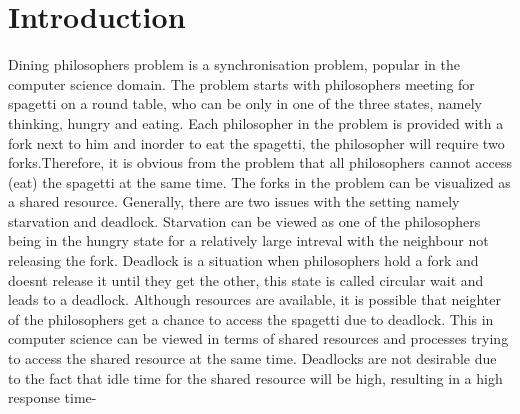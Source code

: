 \section{Introduction}

Dining philosophers problem is a synchronisation problem, popular in the computer science domain. The problem starts with philosophers meeting for spagetti on a round table, who can be only in one of the three states, namely thinking, hungry and eating. Each philosopher in the problem is provided with a fork next to him and inorder to eat the spagetti, the philosopher will require two forks.Therefore, it is obvious from the problem that all philosophers cannot access (eat) the spagetti at the same time. The forks in the problem can be visualized as a shared resource. Generally, there are two issues with the setting namely starvation and deadlock. Starvation can be viewed as one of the philosophers being in the hungry state for a relatively large intreval with the neighbour not releasing the fork. Deadlock is a situation when philosophers hold a fork and doesnt release it until they get the other, this state is called circular wait and leads to a deadlock. Although resources are available, it is possible that neighter of the philosophers get a chance to access the spagetti due to deadlock. This in computer science can be viewed in terms of shared resources and processes trying to access the shared resource at the same time. Deadlocks are not desirable due to the fact that idle time for the shared resource will be high, resulting in  a high response time-    


